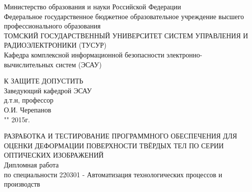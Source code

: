 \newpage
{}

\begin{center}
Министерство образования и науки Российской Федерации\\
Федеральное государственное бюджетное образовательное учреждение высшего профессионального образования\\
ТОМСКИЙ ГОСУДАРСТВЕННЫЙ УНИВЕРСИТЕТ СИСТЕМ УПРАВЛЕНИЯ И РАДИОЭЛЕКТРОНИКИ (ТУСУР)\\
Кафедра комплексной информационной безопасности электронно-вычислительных систем (ЭСАУ)\\
\end{center}

\hfill
\begin{minipage}[right]{0.4\linewidth}
\begin{singlespace}
 К ЗАЩИТЕ ДОПУСТИТЬ \\
 Заведующий кафедрой ЭСАУ \\
 д.т.н, профессор \\
 \underline{\hspace{2.5cm}}О.И. Черепанов \\
 "\underline{\hspace{1cm}}"\underline{\hspace{3cm}} 2015г.\\
\end{singlespace} 
\end{minipage}


\begin{center}
РАЗРАБОТКА И ТЕСТИРОВАНИЕ ПРОГРАММНОГО ОБЕСПЕЧЕНИЯ ДЛЯ ОЦЕНКИ ДЕФОРМАЦИИ ПОВЕРХНОСТИ ТВЁРДЫХ ТЕЛ ПО СЕРИИ ОПТИЧЕСКИХ ИЗОБРАЖЕНИЙ \\
Дипломная работа \\
по специальности 220301 - Автоматизация технологических процессов и производств\\
\vspace{1.0cm}
\end{center}


